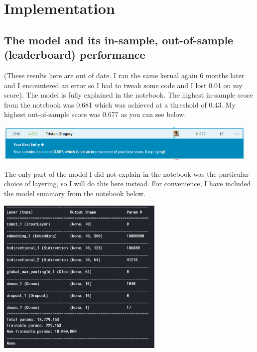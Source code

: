\documentclass{article}
\begin{document}
\section{Implementation}
\subsection{The model and its in-sample, out-of-sample (leaderboard) performance}

(These results here are out of date. I ran the same kernal again 6 months later and I encountered an error so I had to tweak some code and I lost 0.01 on my score). The model is fully explained in the notebook. The highest in-sample score from the notebook was 0.681 which was achieved at a threshold of 0.43. My highest out-of-sample score was 0.677 as you can see below.

\begin{center}
\includegraphics[width=12.8cm]{leaderboard.png}
\end{center}

The only part of the model I did not explain in the notebook was the particular choice of layering, so I will do this here instead. For convenience, I have included the model summary from the notebook below.

\begin{center}
\includegraphics[width=8cm]{summary.png}
\end{center}
\end{document}
